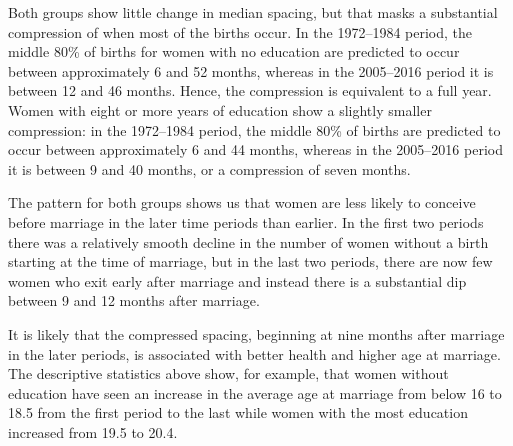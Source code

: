 \documentclass[12pt,letterpaper]{article}
\begin{document}
Both groups show little change in median spacing, but that masks a substantial
compression of when most of the births occur.
In the 1972--1984 period, the middle 80\% of births for women with no education 
are predicted to occur between approximately 6 and 52 months, whereas in the 
2005--2016 period it is between 12 and 46 months.
Hence, the compression is equivalent to a full year.
Women with eight or more years of education show a slightly smaller compression:
in the 1972--1984 period, the middle 80\% of births are predicted to occur between
approximately 6 and 44 months, whereas in the 2005--2016 period it is between
9 and 40 months, or a compression of seven months.

The pattern for both groups shows us that women are less likely to conceive 
before marriage in the later time periods than earlier.
In the first two periods there was a relatively smooth decline in the number of
women without a birth starting at the time of marriage, but in the last two
periods, there are now few women who exit early after marriage and
instead there is a substantial dip between 9 and 12 months after
marriage.

It is likely that the compressed spacing, beginning at nine months
after marriage in the later periods, is associated with better health
and higher age at marriage.
The descriptive statistics above show, for example, that women without 
education have seen an increase in the average age at marriage from below 
16 to 18.5 from the first period to the last while women with the most 
education increased from 19.5 to 20.4.
\end{document}
